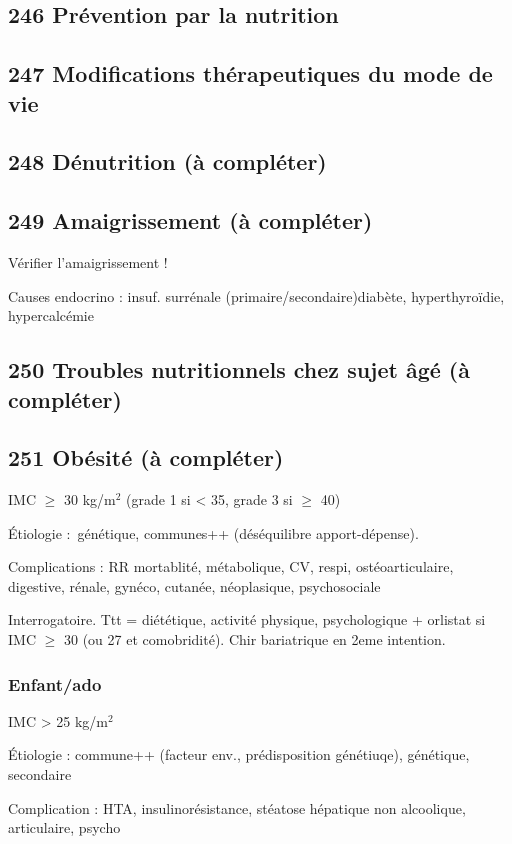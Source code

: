 \documentclass[11pt]{article}
\begin{document}
\subsection{246 Prévention par la nutrition}
\label{sec:orgac517cc}
\subsection{247 Modifications thérapeutiques du mode de vie}
\label{sec:orgdc9ea0c}
\subsection{248 Dénutrition (à compléter)}
\label{sec:orgce77d92}
\subsection{249 Amaigrissement (à compléter)}
\label{sec:org8a0af17}
Vérifier l'amaigrissement !

Causes endocrino : insuf. surrénale (primaire/secondaire)diabète, hyperthyroïdie, hypercalcémie
\subsection{250 Troubles nutritionnels chez sujet âgé (à compléter)}
\label{sec:org3f00027}
\subsection{251 Obésité (à compléter)}
\label{sec:org6778e5e}
IMC \(\ge\) 30 kg/m\(^{\text{2}}\) (grade 1 si < 35, grade 3 si \(\ge\) 40)

Étiologie : génétique, communes++ (déséquilibre apport-dépense).

Complications : \inc RR mortablité, métabolique, CV, respi, ostéoarticulaire, digestive, rénale,
gynéco, cutanée, néoplasique, psychosociale

Interrogatoire. Ttt = diététique, activité physique, psychologique + orlistat si
IMC \(\ge\) 30 (ou 27 et comobridité). Chir bariatrique en 2eme intention.

\subsubsection{Enfant/ado}
\label{sec:org3197b9d}
IMC > 25 kg/m\(^{\text{2}}\)

Étiologie : commune++ (facteur env., prédisposition génétiuqe), génétique,
secondaire

Complication : HTA, insulinorésistance, stéatose hépatique non alcoolique,
articulaire, psycho
\end{document}
